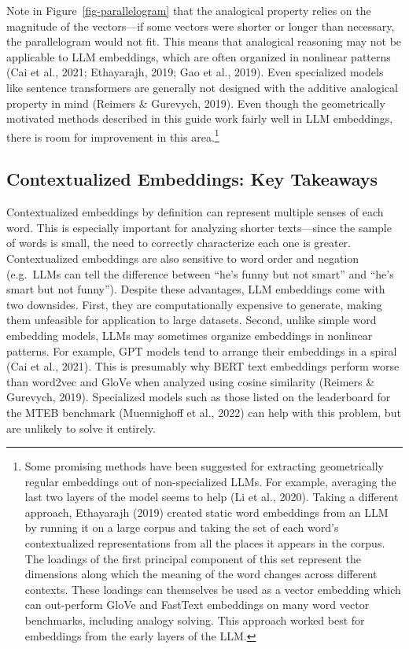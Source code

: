 \documentclass[
  man,
  floatsintext,
  longtable,
  nolmodern,
  notxfonts,
  notimes,
  colorlinks=true,linkcolor=blue,citecolor=blue,urlcolor=blue]{apa7}
\begin{document}
Note in Figure~\ref{fig-parallelogram} that the analogical property
relies on the magnitude of the vectors---if some vectors were shorter or
longer than necessary, the parallelogram would not fit. This means that
analogical reasoning may not be applicable to LLM embeddings, which are
often organized in nonlinear patterns (Cai et al., 2021; Ethayarajh,
2019; Gao et al., 2019). Even specialized models like sentence
transformers are generally not designed with the additive analogical
property in mind (Reimers \& Gurevych, 2019). Even though the
geometrically motivated methods described in this guide work fairly well
in LLM embeddings, there is room for improvement in this
area.\footnote{Some promising methods have been suggested for extracting
  geometrically regular embeddings out of non-specialized LLMs. For
  example, averaging the last two layers of the model seems to help (Li
  et al., 2020). Taking a different approach, Ethayarajh (2019) created
  static word embeddings from an LLM by running it on a large corpus and
  taking the set of each word's contextualized representations from all
  the places it appears in the corpus. The loadings of the first
  principal component of this set represent the dimensions along which
  the meaning of the word changes across different contexts. These
  loadings can themselves be used as a vector embedding which can
  out-perform GloVe and FastText embeddings on many word vector
  benchmarks, including analogy solving. This approach worked best for
  embeddings from the early layers of the LLM.}

\subsection{Contextualized Embeddings: Key
Takeaways}\label{contextualized-embeddings-key-takeaways}

Contextualized embeddings by definition can represent multiple senses of
each word. This is especially important for analyzing shorter
texts---since the sample of words is small, the need to correctly
characterize each one is greater. Contextualized embeddings are also
sensitive to word order and negation (e.g.~LLMs can tell the difference
between ``he's funny but not smart'' and ``he's smart but not funny'').
Despite these advantages, LLM embeddings come with two downsides. First,
they are computationally expensive to generate, making them unfeasible
for application to large datasets. Second, unlike simple word embedding
models, LLMs may sometimes organize embeddings in nonlinear patterns.
For example, GPT models tend to arrange their embeddings in a spiral
(Cai et al., 2021). This is presumably why BERT text embeddings perform
worse than word2vec and GloVe when analyzed using cosine similarity
(Reimers \& Gurevych, 2019). Specialized models such as those listed on
the leaderboard for the MTEB benchmark (Muennighoff et al., 2022) can
help with this problem, but are unlikely to solve it entirely.
\end{document}
